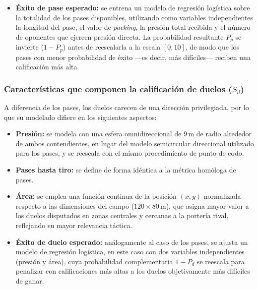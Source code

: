 \documentclass[conference]{IEEEtran}
\begin{document}
\begin{itemize}
    \item \textbf{Éxito de pase esperado:} se entrena un modelo de regresión logística sobre la totalidad de los pases disponibles, utilizando como variables independientes la longitud del pase, el valor de \textit{packing}, la presión total recibida y el número de oponentes que ejercen presión directa. La probabilidad resultante $P_p$ se invierte ($1-P_p$) antes de reescalarla a la escala $[0,10]$, de modo que los pases con menor probabilidad de éxito —es decir, más difíciles— reciben una calificación más alta.
\end{itemize}

\subsubsection{Características que componen la calificación de duelos ($S_d$)}
A diferencia de los pases, los duelos carecen de una dirección privilegiada, por lo que su modelado difiere en los siguientes aspectos:
\begin{itemize}
    \item \textbf{Presión:} se modela con una esfera omnidireccional de 9\,m de radio alrededor de ambos contendientes, en lugar del modelo semicircular direccional utilizado para los pases, y se reescala con el mismo procedimiento de punto de codo.
    \item \textbf{Pases hasta tiro:} se define de forma idéntica a la métrica homóloga de pases.
    \item \textbf{Área:} se emplea una función continua de la posición $(x,y)$ normalizada respecto a las dimensiones del campo ($120\times80$\,m), que asigna mayor valor a los duelos disputados en zonas centrales y cercanas a la portería rival, reflejando su mayor relevancia táctica.
    \item \textbf{Éxito de duelo esperado:} análogamente al caso de los pases, se ajusta un modelo de regresión logística, en este caso con dos variables independientes (presión y área), cuya probabilidad complementaria $1-P_d$ se reescala para penalizar con calificaciones más altas a los duelos objetivamente más difíciles de ganar.
\end{itemize}
\end{document}
